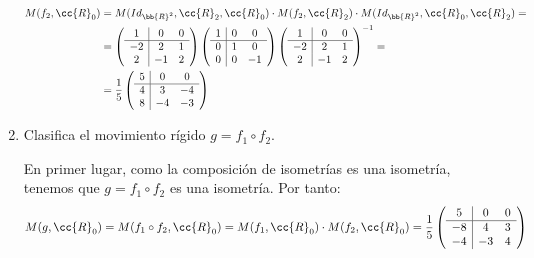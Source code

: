 \begin{ejercicio}
\begin{enumerate}
        \begin{align*}
            M(f_2,\cc{R}_0) &= M(Id_{\bb{R}^2},\cc{R}_2,\cc{R}_0)\cdot M(f_2,\cc{R}_2) \cdot M(Id_{\bb{R}^2},\cc{R}_0,\cc{R}_2) =\\
            &= \left(\begin{array}{c|cc}
                1 & 0 & 0 \\ \hline
                -2 & 2 & 1 \\
                2 & -1 & 2
            \end{array}\right)
            \left(\begin{array}{c|cc}
                1 & 0 & 0 \\ \hline
                0 & 1 & 0 \\
                0 & 0 & -1
            \end{array}\right)
            \left(\begin{array}{c|cc}
                1 & 0 & 0 \\ \hline
                -2 & 2 & 1 \\
                2 & -1 & 2
            \end{array}\right)^{-1}
            =\\&= \frac{1}{5}\left(\begin{array}{c|cc}
                5 & 0 & 0 \\ \hline
                4 & 3 & -4 \\
                8 & -4 & -3
            \end{array}\right)
        \end{align*}

        \item Clasifica el movimiento rígido $g = f_1 \circ f_2$.
        
        En primer lugar, como la composición de isometrías es una isometría, tenemos que $g=f_1\circ f_2$ es una isometría. Por tanto:
        \begin{equation*}
            M(g,\cc{R}_0) = M(f_1\circ f_2,\cc{R}_0) = M(f_1,\cc{R}_0)\cdot M(f_2,\cc{R}_0)
            = \frac{1}{5}\left(\begin{array}{c|cc}
                5 & 0 & 0 \\ \hline
                -8 & 4 & 3 \\
                -4 & -3 & 4
            \end{array}\right)
        \end{equation*}


\end{enumerate}
\end{ejercicio}
